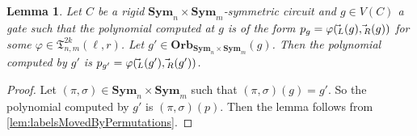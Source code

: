 \documentclass[11pt, DIV=15]{scrarticle}
\theoremstyle{definition}
\theoremstyle{plain}
\newtheorem{lemma}[definition]{Lemma}
\theoremstyle{remark}
\renewcommand{\phi}{\varphi}
\newcommand{\Sym}{\mathbf{Sym}}
\newcommand{\Orb}{\mathbf{Orb}}
\let\sup\relax
\DeclareMathOperator{\sup}{sup}
\begin{document}
 	\begin{lemma}
 		\label{lem:supportOfGateDeterminesLabels}
 		Let $C$ be a rigid $\Sym_n \times \Sym_m$-symmetric circuit and $g \in V(C)$ a gate such that the polynomial computed at $g$ is of the form $p_g = \phi(\vec{\sup}_L(g),\vec{\sup}_R(g))$ for some $\phi \in \mathfrak{T}^{2k}_{n,m}(\ell, r)$.
 		Let $g' \in \Orb_{\Sym_{n} \times \Sym_{m}}(g)$. Then the polynomial computed by $g'$ is $p_{g'} = \phi(\vec{\sup}_L(g'),\vec{\sup}_R(g'))$.
 	\end{lemma}	
 	\begin{proof}
 		Let $(\pi, \sigma) \in \Sym_{n} \times \Sym_{m}$ such that $(\pi, \sigma)(g)  = g'$. So the polynomial computed by $g'$ is $(\pi, \sigma)(p)$. 
 		Then the lemma follows from \cref{lem:labelsMovedByPermutations}.
 	\end{proof}	
 	
 	
 	 	
\end{document}
